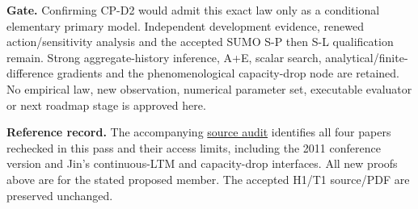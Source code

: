 \documentclass[11pt,a4paper]{article}
\begin{document}
\textbf{Gate.} Confirming CP-D2 would admit this exact law only as a
conditional elementary primary model. Independent development evidence,
renewed action/sensitivity analysis and the accepted SUMO S-P then S-L
qualification remain. Strong aggregate-history inference, A+E, scalar
search, analytical/finite-difference gradients and the phenomenological
capacity-drop node are retained. No empirical law, new observation, numerical
parameter set, executable evaluator or next roadmap stage is approved here.

\textbf{Reference record.} The accompanying
\href{../../extraction/research_readiness/vsl_ph_source_and_adaptation_audit.md}{source audit}
identifies all four papers rechecked in this pass and their access limits,
including the 2011 conference version and Jin's continuous-LTM and
capacity-drop interfaces. All new proofs above are for the stated proposed
member. The accepted H1/T1 source/PDF are preserved unchanged.
\end{document}
